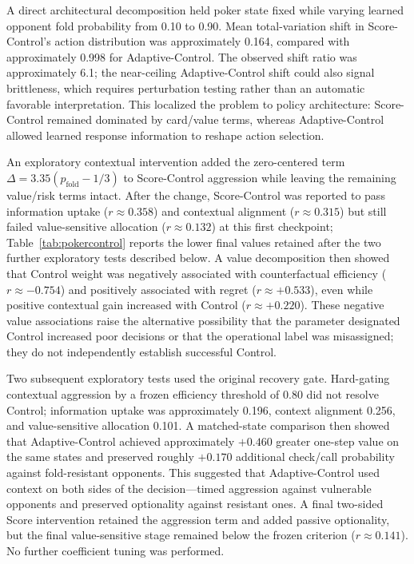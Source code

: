\documentclass[journal]{IEEEtran}
\begin{document}
A direct architectural decomposition held poker state fixed while varying learned opponent fold probability from 0.10 to 0.90. Mean total-variation shift in Score-Control's action distribution was approximately 0.164, compared with approximately 0.998 for Adaptive-Control. The observed shift ratio was approximately 6.1; the near-ceiling Adaptive-Control shift could also signal brittleness, which requires perturbation testing rather than an automatic favorable interpretation. This localized the problem to policy architecture: Score-Control remained dominated by card/value terms, whereas Adaptive-Control allowed learned response information to reshape action selection.

An exploratory contextual intervention added the zero-centered term $\Delta = 3.35(p_{\text{fold}} - 1/3)$ to Score-Control aggression while leaving the remaining value/risk terms intact. After the change, Score-Control was reported to pass information uptake ($r \approx 0.358$) and contextual alignment ($r \approx 0.315$) but still failed value-sensitive allocation ($r \approx 0.132$) at this first checkpoint; Table~\ref{tab:pokercontrol} reports the lower final values retained after the two further exploratory tests described below. A value decomposition then showed that Control weight was negatively associated with counterfactual efficiency ($r \approx -0.754$) and positively associated with regret ($r \approx +0.533$), even while positive contextual gain increased with Control ($r \approx +0.220$). These negative value associations raise the alternative possibility that the parameter designated Control increased poor decisions or that the operational label was misassigned; they do not independently establish successful Control.

Two subsequent exploratory tests used the original recovery gate. Hard-gating contextual aggression by a frozen efficiency threshold of 0.80 did not resolve Control; information uptake was approximately 0.196, context alignment 0.256, and value-sensitive allocation 0.101. A matched-state comparison then showed that Adaptive-Control achieved approximately $+0.460$ greater one-step value on the same states and preserved roughly $+0.170$ additional check/call probability against fold-resistant opponents. This suggested that Adaptive-Control used context on both sides of the decision---timed aggression against vulnerable opponents and preserved optionality against resistant ones. A final two-sided Score intervention retained the aggression term and added passive optionality, but the final value-sensitive stage remained below the frozen criterion ($r \approx 0.141$). No further coefficient tuning was performed.
\end{document}
